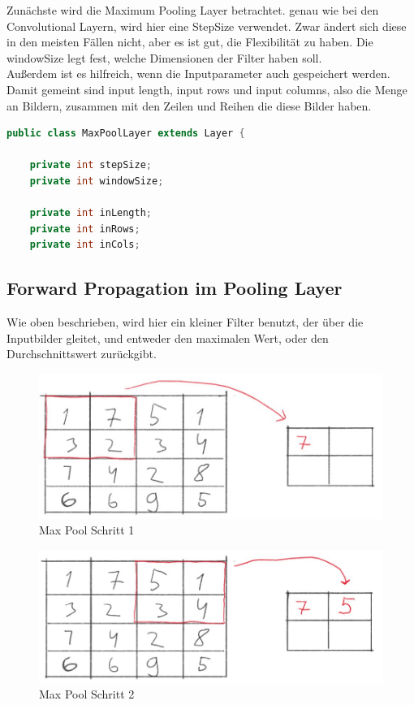 \documentclass[12pt]{article}
\begin{document}
Zunächste wird die Maximum Pooling Layer betrachtet.
genau wie bei den Convolutional Layern, wird hier eine StepSize verwendet. Zwar ändert sich diese in den meisten Fällen nicht, aber es ist gut, die Flexibilität zu haben.
Die windowSize legt fest, welche Dimensionen der Filter haben soll.
\\Außerdem ist es hilfreich, wenn die Inputparameter auch gespeichert werden. Damit gemeint sind input length, input rows und input columns, also die Menge an Bildern, zusammen mit den Zeilen und Reihen die diese Bilder haben.

\begin{lstlisting}[language=Java]
public class MaxPoolLayer extends Layer {

    private int stepSize;
    private int windowSize;

    private int inLength;
    private int inRows;
    private int inCols;
\end{lstlisting} 

\subsection{Forward Propagation im Pooling Layer}
Wie oben beschrieben, wird hier ein kleiner Filter benutzt, der über die Inputbilder gleitet, und entweder den maximalen Wert, oder den Durchschnittswert zurückgibt. 

\begin{figure}[htp]
\centering
\includegraphics[scale=0.40]{Images/008_MaxPool1.jpg}
\caption{Max Pool Schritt  1}
\label{Max Pool Schritt  1}
\end{figure}

\begin{figure}[htp]
\centering
\includegraphics[scale=0.40]{Images/009_MaxPool2.jpg}
\caption{Max Pool Schritt 2}
\label{Max Pool Schritt  2}
\end{figure}
\end{document}

